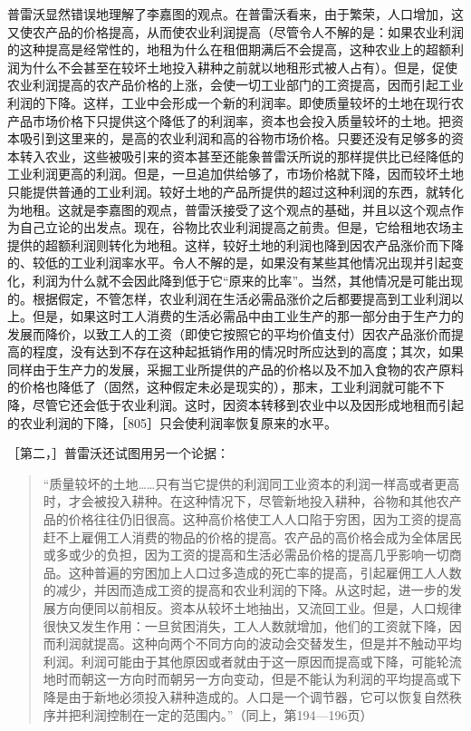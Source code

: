 普雷沃显然错误地理解了李嘉图的观点。在普雷沃看来，由于繁荣，人口增加，这又使农产品的价格提高，从而使农业利润提高（尽管令人不解的是：如果农业利润的这种提高是经常性的，地租为什么在租佃期满后不会提高，这种农业上的超额利润为什么不会甚至在较坏土地投入耕种之前就以地租形式被人占有）。但是，促使农业利润提高的农产品价格的上涨，会使一切工业部门的工资提高，因而引起工业利润的下降。这样，工业中会形成一个新的利润率。即使质量较坏的土地在现行农产品市场价格下只提供这个降低了的利润率，资本也会投入质量较坏的土地。把资本吸引到这里来的，是高的农业利润和高的谷物市场价格。只要还没有足够多的资本转入农业，这些被吸引来的资本甚至还能象普雷沃所说的那样提供比已经降低的工业利润更高的利润。但是，一旦追加供给够了，市场价格就下降，因而较坏土地只能提供普通的工业利润。较好土地的产品所提供的超过这种利润的东西，就转化为地租。这就是李嘉图的观点，普雷沃接受了这个观点的基础，并且以这个观点作为自己立论的出发点。现在，谷物比农业利润提高之前贵。但是，它给租地农场主提供的超额利润则转化为地租。这样，较好土地的利润也降到因农产品涨价而下降的、较低的工业利润率水平。令人不解的是，如果没有某些其他情况出现并引起变化，利润为什么就不会因此降到低于它“原来的比率”。当然，其他情况是可能出现的。根据假定，不管怎样，农业利润在生活必需品涨价之后都要提高到工业利润以上。但是，如果这时工人消费的生活必需品中由工业生产的那一部分由于生产力的发展而降价，以致工人的工资（即使它按照它的平均价值支付）因农产品涨价而提高的程度，没有达到不存在这种起抵销作用的情况时所应达到的高度；其次，如果同样由于生产力的发展，采掘工业所提供的产品的价格以及不加入食物的农产原料的价格也降低了（固然，这种假定未必是现实的），那末，工业利润就可能不下降，尽管它还会低于农业利润。这时，因资本转移到农业中以及因形成地租而引起的农业利润的下降，［805］只会使利润率恢复原来的水平。

［第二，］普雷沃还试图用另一个论据：

\begin{quote}{“质量较坏的土地……只有当它提供的利润同工业资本的利润一样高或者更高时，才会被投入耕种。在这种情况下，尽管新地投入耕种，谷物和其他农产品的价格往往仍旧很高。这种高价格使工人人口陷于穷困，因为工资的提高赶不上雇佣工人消费的物品的价格的提高。农产品的高价格会成为全体居民或多或少的负担，因为工资的提高和生活必需品价格的提高几乎影响一切商品。这种普遍的穷困加上人口过多造成的死亡率的提高，引起雇佣工人人数的减少，并因而造成工资的提高和农业利润的下降。从这时起，进一步的发展方向便同以前相反。资本从较坏土地抽出，又流回工业。但是，人口规律很快又发生作用：一旦贫困消失，工人人数就增加，他们的工资就下降，因而利润就提高。这种向两个不同方向的波动会交替发生，但是并不触动平均利润。利润可能由于其他原因或者就由于这一原因而提高或下降，可能轮流地时而朝这一方向时而朝另一方向变动，但是不能认为利润的平均提高或下降是由于新地必须投入耕种造成的。人口是一个调节器，它可以恢复自然秩序并把利润控制在一定的范围内。”（同上，第194—196页）}\end{quote}

